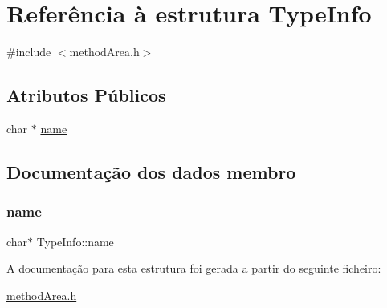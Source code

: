 \hypertarget{struct_type_info}{}\section{Referência à estrutura Type\+Info}
\label{struct_type_info}


{\ttfamily \#include $<$method\+Area.\+h$>$}

\subsection*{Atributos Públicos}
\begin{DoxyCompactItemize}
\item 
char $\ast$ \hyperlink{struct_type_info_ac1577516ffc54df13b02b23bd50ed5b4}{name}
\end{DoxyCompactItemize}


\subsection{Documentação dos dados membro}
\hypertarget{struct_type_info_ac1577516ffc54df13b02b23bd50ed5b4}{}\label{struct_type_info_ac1577516ffc54df13b02b23bd50ed5b4} 
\subsubsection{\texorpdfstring{name}{name}}
{\footnotesize\ttfamily char$\ast$ Type\+Info\+::name}



A documentação para esta estrutura foi gerada a partir do seguinte ficheiro\+:\begin{DoxyCompactItemize}
\item 
\hyperlink{method_area_8h}{method\+Area.\+h}\end{DoxyCompactItemize}
